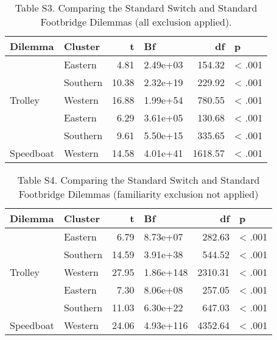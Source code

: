 \documentclass[
]{article}
\begin{document}
\begin{table}[H]

\caption{\label{tab:standard switch and footbridge}Table S3. Comparing the Standard Switch and Standard Footbridge Dilemmas (all exclusion applied).}
\begin{tabular}[t]{llrlrl}
\toprule
\textbf{Dilemma} & \textbf{Cluster} & \textbf{t} & \textbf{Bf} & \textbf{df} & \textbf{p}\\
\midrule
 & Eastern & 4.81 & 2.49e+03 & 154.32 & < .001\\

 & Southern & 10.38 & 2.32e+19 & 229.92 & < .001\\

\multirow[t]{-3}{*}{\raggedright\arraybackslash Trolley} & Western & 16.88 & 1.99e+54 & 780.55 & < .001\\
\cmidrule{1-6}
 & Eastern & 6.29 & 3.61e+05 & 130.68 & < .001\\

 & Southern & 9.61 & 5.50e+15 & 335.65 & < .001\\

\multirow[t]{-3}{*}{\raggedright\arraybackslash Speedboat} & Western & 14.58 & 4.01e+41 & 1618.57 & < .001\\
\bottomrule
\end{tabular}
\end{table}

\begin{table}[H]

\caption{\label{tab:switch vs footbridge no familiarity}Table S4. Comparing the Standard Switch and Standard Footbridge Dilemmas (familiarity exclusion not applied)}
\begin{tabular}[t]{llrlrl}
\toprule
\textbf{Dilemma} & \textbf{Cluster} & \textbf{t} & \textbf{Bf} & \textbf{df} & \textbf{p}\\
\midrule
 & Eastern & 6.79 & 8.73e+07 & 282.63 & < .001\\

 & Southern & 14.59 & 3.91e+38 & 544.52 & < .001\\

\multirow[t]{-3}{*}{\raggedright\arraybackslash Trolley} & Western & 27.95 & 1.86e+148 & 2310.31 & < .001\\
\cmidrule{1-6}
 & Eastern & 7.30 & 8.06e+08 & 257.05 & < .001\\

 & Southern & 11.03 & 6.30e+22 & 647.03 & < .001\\

\multirow[t]{-3}{*}{\raggedright\arraybackslash Speedboat} & Western & 24.06 & 4.93e+116 & 4352.64 & < .001\\
\bottomrule
\end{tabular}
\end{table}
\end{document}
